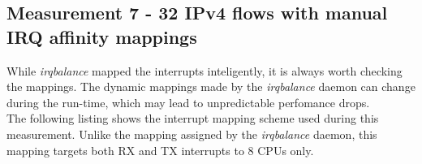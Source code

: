 
\subsection{Measurement 7 - 32 IPv4 flows with manual IRQ affinity mappings}
While {\it{irqbalance}} mapped the interrupts inteligently, it is always worth checking the mappings.
The dynamic mappings made by the {\it{irqbalance}} daemon can change during the run-time, which may lead
to unpredictable perfomance drops.
\\
The following listing shows the interrupt mapping scheme used during this measurement.
Unlike the mapping assigned by the {\it{irqbalance}} daemon,
this mapping targets both RX and TX interrupts to 8 CPUs only.
